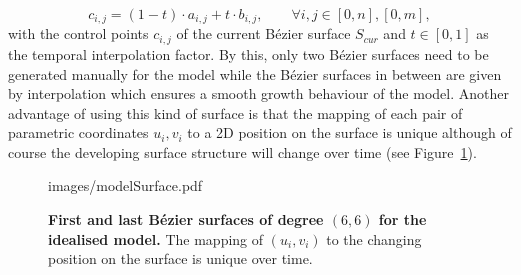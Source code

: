 \documentclass[11pt,a4paper, final]{article}
\begin{document}
\begin{equation}
c_{i,j} = (1-t) \cdot a_{i,j} + t \cdot b_{i,j}, \qquad \forall i, j \in [0, n], [0, m],
\end{equation}
with the control points $c_{i,j}$ of the current B\'ezier surface $S_{cur}$ and $t \in [0,1]$ as the temporal interpolation factor. By this, only two B\'ezier surfaces need to be generated manually for the model while the B\'ezier surfaces in between are given by interpolation which ensures a smooth growth behaviour of the model. Another advantage of using this kind of surface is that the mapping of each pair of parametric coordinates $u_i, v_i$ to a 2D position on the surface is unique although of course the developing surface structure will change over time (see Figure~\ref{fig:modelSurface}).
%
\begin{figure}[htbp]
	\begin{center}
		\begin{overpic}[width=0.8\linewidth]{images/modelSurface.pdf}
		\end{overpic}
\caption[]
{
{\bf First and last B\'ezier surfaces of degree $(6, 6)$ for the idealised model.} The mapping of $(u_i, v_i)$ to the changing position on the surface is unique over time.
}
	\label{fig:modelSurface}
	\end{center}
\end{figure}
%
\end{document}
